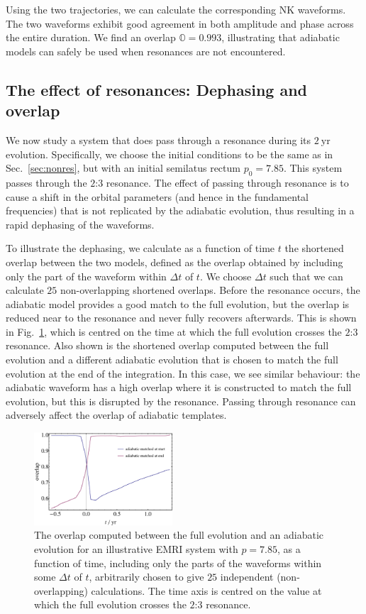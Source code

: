 \documentclass[aps,prd,amsfonts,amssymb,amsmath,nofootinbib,showpacs,superscriptaddress,twocolumn]{revtex4}
\newcommand{\figref}[1]{Fig.~\ref{fig:#1}}
\newcommand{\secref}[1]{Sec.~\ref{sec:#1}}
\begin{document}
Using the two trajectories, we can calculate the corresponding NK waveforms. The two waveforms exhibit good agreement in both amplitude and phase across the entire duration. We find an overlap $\mathbb{O} = 0.993$, illustrating that adiabatic models can safely be used when resonances are not encountered.

\subsection{The effect of resonances: Dephasing and overlap}
\label{sec:effres-phase}

We now study a system that does pass through a resonance during its $2~\mathrm{yr}$ evolution. Specifically, we choose the initial conditions to be the same as in \secref{nonres}, but with an initial semilatus rectum $p_0 = 7.85$. This system passes through the $2$:$3$ resonance. The effect of passing through resonance is to cause a shift in the orbital parameters (and hence in the fundamental frequencies) that is not replicated by the adiabatic evolution, thus resulting in a rapid dephasing of the waveforms.

To illustrate the dephasing, we calculate as a function of time $t$ the shortened overlap between the two models, defined as the overlap obtained by including only the part of the waveform within $\Delta t$ of $t$. We choose $\Delta t$ such that we can calculate $25$ non-overlapping shortened overlaps. Before the resonance occurs, the adiabatic model provides a good match to the full evolution, but the overlap is reduced near to the resonance and never fully recovers afterwards. This is shown in \figref{overlap-dephasing}, which is centred on the time at which the full evolution crosses the $2$:$3$ resonance. Also shown is the shortened overlap computed between the full evolution and a different adiabatic evolution that is chosen to match the full evolution at the end of the integration. In this case, we see similar behaviour: the adiabatic waveform has a high overlap where it is constructed to match the full evolution, but this is disrupted by the resonance. Passing through resonance can adversely affect the overlap of adiabatic templates.

\begin{figure}
\centering
\includegraphics[width=0.46\textwidth]{Fig_overlap_vs_time}
\caption{\label{fig:overlap-dephasing}The overlap computed between the full evolution and an adiabatic evolution for an illustrative EMRI system with $p=7.85$, as a function of time, including only the parts of the waveforms within some $\Delta t$ of $t$, arbitrarily chosen to give $25$ independent (non-overlapping) calculations. The time axis is centred on the value at which the full evolution crosses the $2$:$3$ resonance.}
\end{figure}
\end{document}
